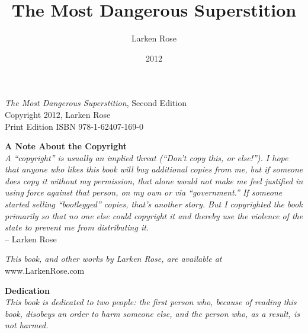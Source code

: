 \documentclass{book}
\title{The Most Dangerous Superstition}
\author{Larken Rose}
\date{2012}
\begin{document}
\maketitle

\vspace*{\fill}

\begin{center}
  \emph{The Most Dangerous Superstition}, Second Edition \\
  Copyright 2012, Larken Rose \\
  Print Edition ISBN 978-1-62407-169-0
\end{center}

\vspace{\fill}

\begin{center}
  \textbf{A Note About the Copyright} \\
  \emph{A \enquote{copyright} is usually an implied threat (\enquote{Don't copy this, or else!}). I hope that anyone who likes this book will buy additional copies from me, but if someone does copy it without my permission, that alone would not make me feel justified in using force against that person, on my own or via \enquote{government.} If someone started selling \enquote{bootlegged} copies, that's another story. But I copyrighted the book primarily so that no one else could copyright it and thereby use the violence of the state to prevent me from distributing it.} \\
 -- Larken Rose
\end{center}

\tableofcontents

\begin{center}
  \emph{This book, and other works by Larken Rose, are available at} www.LarkenRose.com
\end{center}

\newpage

\vspace*{\fill}

\begin{center}
  \textbf{Dedication} \\
  \emph{This book is dedicated to two people: the first person who, because of reading this book, disobeys an order to harm someone else, and the person who, as a result, is not harmed.}
\end{center}

\vspace*{\fill}

\newpage
\end{document}
